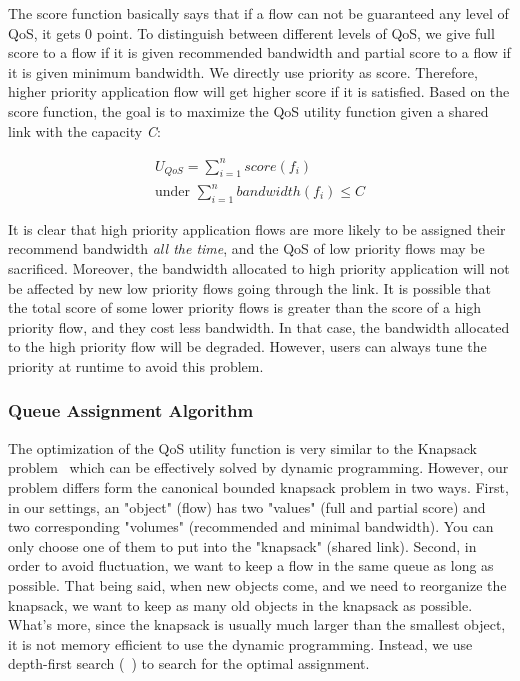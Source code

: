 The score function basically says that if a flow can not be guaranteed any level of QoS, it gets 0 point. To distinguish between different
levels of QoS, we give full score to a flow if it is given recommended bandwidth and partial score to a flow if it is given minimum bandwidth.
We directly use priority as score. Therefore, higher priority application flow will get higher score if it is satisfied. Based on the score
function, the goal is to maximize the QoS utility function given a shared link with the capacity \emph{C}:

\begin{equation}
\begin{split}
  U_{QoS} = \sum_{i=1}^{n} score(f_i) \\ 
  \text{under } \sum_{i=1}^{n} bandwidth(f_i) \leq C
\end{split}
\end{equation}

It is clear that high priority application flows are more likely to be assigned their recommend bandwidth \emph{all the time}, and the QoS of low
priority flows may be sacrificed. Moreover, the bandwidth allocated to high priority application will not be affected by new low priority flows
going through the link. It is possible that the total score of some lower priority flows is greater than the score of a high priority flow, and
they cost less bandwidth. In that case, the bandwidth allocated to the high priority flow will be degraded. However, users can always tune the
priority at runtime to avoid this problem.

\subsubsection{Queue Assignment Algorithm}
\label{sect:queueAssignAlgo}

The optimization of the QoS utility function is very similar to the Knapsack problem~\cite{knapsack} which can be effectively solved by dynamic
programming. However, our problem differs form the canonical bounded knapsack problem in two ways. First, in our settings, an "object" (flow) has
two "values" (full and partial score) and two corresponding "volumes" (recommended and minimal bandwidth). You can only choose one of them to put
into the "knapsack" (shared link). Second, in order to avoid fluctuation, we want to keep a flow in the same queue as long as possible. That being
said, when new objects come, and we need to reorganize the knapsack, we want to keep as many old objects in the knapsack as possible. What's more,
since the knapsack is usually much larger than the smallest object, it is not memory efficient to use the dynamic programming. Instead, we use
depth-first search (~) to search for the optimal assignment.

